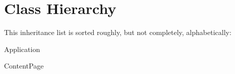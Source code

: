 \section{Class Hierarchy}
This inheritance list is sorted roughly, but not completely, alphabetically\+:\begin{DoxyCompactList}
\item Application\begin{DoxyCompactList}
\item {}
\end{DoxyCompactList}
\item Content\+Page\begin{DoxyCompactList}
\item {}
\end{DoxyCompactList}
\end{DoxyCompactList}
